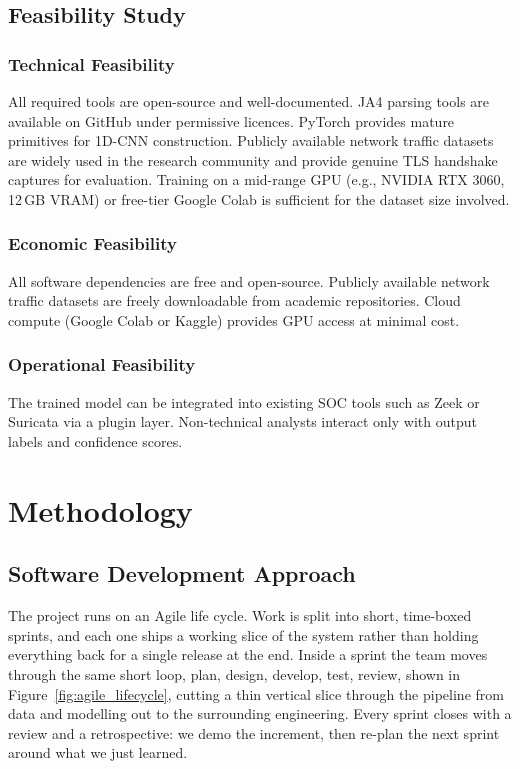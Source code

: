\documentclass[12pt,a4paper]{report}
\begin{document}
\section{Feasibility Study}

\subsection{Technical Feasibility}
All required tools are open-source and well-documented. JA4 parsing tools are
available on GitHub under permissive licences. PyTorch provides mature primitives
for 1D-CNN construction. Publicly available network traffic datasets are widely used in
the research community and provide genuine TLS handshake captures for evaluation. Training on a mid-range GPU (e.g., NVIDIA RTX 3060,
12\,GB VRAM) or free-tier Google Colab is sufficient for the dataset size involved.

\subsection{Economic Feasibility}
All software dependencies are free and open-source. Publicly available network traffic datasets are freely
downloadable from academic repositories. Cloud compute (Google Colab or Kaggle) provides GPU access at minimal
cost.

\subsection{Operational Feasibility}
The trained model can be integrated into existing SOC tools such as Zeek or
Suricata via a plugin layer. Non-technical analysts interact only with output
labels and confidence scores.

\chapter{Methodology}

\section{Software Development Approach}

The project runs on an Agile life cycle. Work is split into short, time-boxed sprints, and each one ships a working slice of the system rather than holding everything back for a single release at the end. Inside a sprint the team moves through the same short loop, plan, design, develop, test, review, shown in Figure~\ref{fig:agile_lifecycle}, cutting a thin vertical slice through the pipeline from data and modelling out to the surrounding engineering. Every sprint closes with a review and a retrospective: we demo the increment, then re-plan the next sprint around what we just learned.
\end{document}
